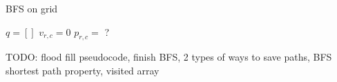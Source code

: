\documentclass{article}
\begin{document}
    \begin{algorithm}
        \caption{BFS on grid}
        \begin{algorithmic}[1]
                \State $q = []$
                \State $v_{r, c} = 0$
                \State $p_{r, c} = $ ?
            \EndFunction
        \end{algorithmic}
    \end{algorithm}

    TODO: flood fill pseudocode, finish BFS, 2 types of ways to save paths, BFS shortest path property, visited array
\end{document}
